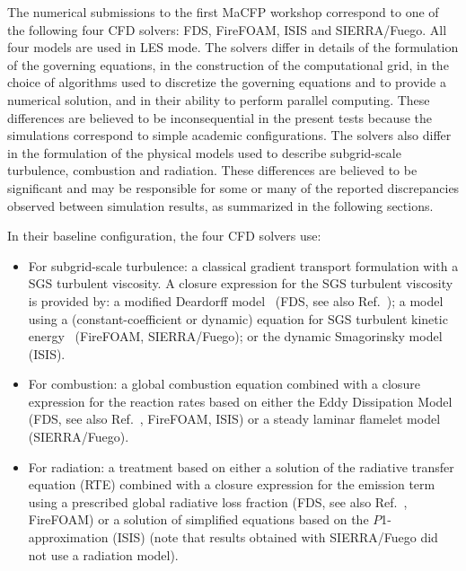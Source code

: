 The numerical submissions to the first MaCFP workshop correspond to one of the following four CFD solvers: FDS, FireFOAM, ISIS and SIERRA/Fuego. All four models are used in LES mode. The solvers differ in details of the formulation of the governing equations, in the construction of the computational grid, in the choice of algorithms used to discretize the governing equations and to provide a numerical solution, and in their ability to perform parallel computing. These differences are believed to be inconsequential in the present tests because the simulations correspond to simple academic configurations. The solvers also differ in the formulation of the physical models used to describe subgrid-scale turbulence, combustion and radiation. These differences are believed to be significant and may be responsible for some or many of the reported discrepancies observed between simulation results, as summarized in the following sections.

In their baseline configuration, the four CFD solvers use:
\begin{itemize}
\item For subgrid-scale turbulence: a classical gradient transport formulation with a SGS turbulent viscosity. A closure expression for the SGS turbulent viscosity is provided by: a modified Deardorff model~\cite{Deardorff:1980} (FDS, see also Ref.~\cite{FDS_Math_Guide}); a model using a (constant-coefficient or dynamic) equation for SGS turbulent kinetic energy~\cite{Fureby:1997} (FireFOAM, SIERRA/Fuego); or the dynamic Smagorinsky model~\cite{Moin:1991} (ISIS).
\item For combustion: a global combustion equation combined with a closure expression for the reaction rates based on either the Eddy Dissipation Model~\cite{Magnussen:1976} (FDS, see also Ref.~\cite{FDS_Math_Guide}, FireFOAM, ISIS) or a steady laminar flamelet model~\cite{SIERRA/Fuego_User_Guide1,SIERRA/Fuego_User_Guide2} (SIERRA/Fuego).
\item For radiation: a treatment based on either a solution of the radiative transfer equation (RTE) combined with a closure expression for the emission term using a prescribed global radiative loss fraction (FDS, see also Ref.~\cite{FDS_Math_Guide}, FireFOAM) or a solution of simplified equations based on the $P$1-approximation (ISIS)  (note that results obtained with SIERRA/Fuego did not use a radiation model).
\end{itemize}

